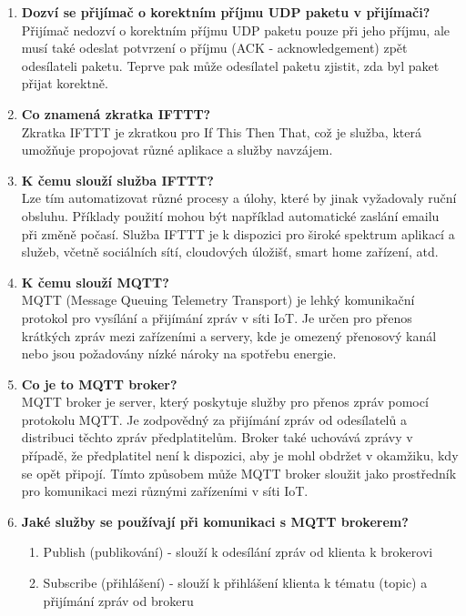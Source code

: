 \documentclass{article}
\begin{document}
\begin{enumerate}
        \item \textbf{Dozví se přijímač o korektním příjmu UDP paketu v přijímači?} \\[0.6em] { Přijímač nedozví o korektním příjmu UDP paketu pouze při jeho příjmu, ale musí také odeslat potvrzení o příjmu (ACK - acknowledgement) zpět odesílateli paketu. Teprve pak může odesílatel paketu zjistit, zda byl paket přijat korektně.}
        \item \textbf{Co znamená zkratka IFTTT?} \\[0.6em] { Zkratka IFTTT je zkratkou pro If This Then That, což je služba, která umožňuje propojovat různé aplikace a služby navzájem.}
        \item \textbf{K čemu slouží služba IFTTT?} \\[0.6em] { Lze tím automatizovat různé procesy a úlohy, které by jinak vyžadovaly ruční obsluhu. Příklady použití mohou být například automatické zaslání emailu při změně počasí. Služba IFTTT je k dispozici pro široké spektrum aplikací a služeb, včetně sociálních sítí, cloudových úložišť, smart home zařízení, atd.}
        \item \textbf{K čemu slouží MQTT?} \\[0.6em] { MQTT (Message Queuing Telemetry Transport) je lehký komunikační protokol pro vysílání a přijímání zpráv v síti IoT. Je určen pro přenos krátkých zpráv mezi zařízeními a servery, kde je omezený přenosový kanál nebo jsou požadovány nízké nároky na spotřebu energie.}
        \item \textbf{Co je to MQTT broker?} \\[0.6em] { MQTT broker je server, který poskytuje služby pro přenos zpráv pomocí protokolu MQTT. Je zodpovědný za přijímání zpráv od odesílatelů a distribuci těchto zpráv předplatitelům. Broker také uchovává zprávy v případě, že předplatitel není k dispozici, aby je mohl obdržet v okamžiku, kdy se opět připojí. Tímto způsobem může MQTT broker sloužit jako prostředník pro komunikaci mezi různými zařízeními v síti IoT.}
        \item \textbf{Jaké služby se používají při komunikaci s MQTT brokerem?} \\[-1.5em]
        \begin{enumerate}
            \item {Publish (publikování) - slouží k odesílání zpráv od klienta k brokerovi}
            \item {Subscribe (přihlášení) - slouží k přihlášení klienta k tématu (topic) a přijímání zpráv od brokeru}

\end{enumerate}
\end{enumerate}
\end{document}
